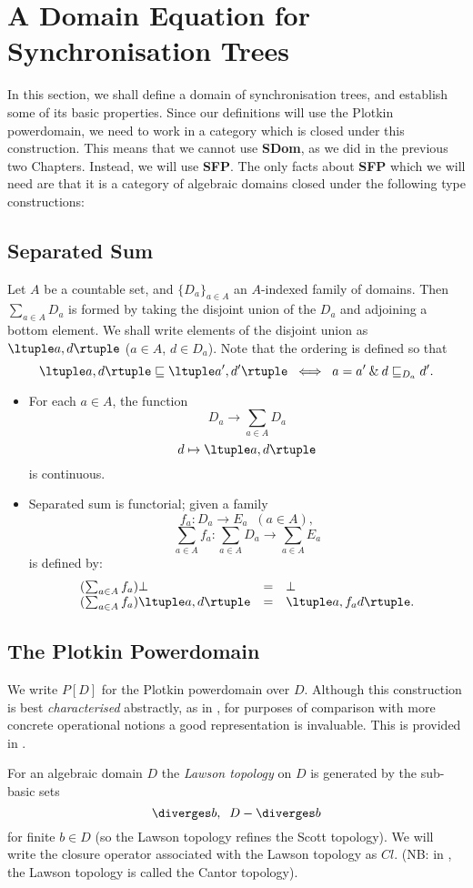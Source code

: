 \section{A Domain Equation for Synchronisation Trees}

In this section, we shall define a domain of synchronisation trees, and establish some of its basic properties.
Since our definitions will use the Plotkin powerdomain, we need to work in a category which is closed under this construction.
This means that we cannot use {\bf SDom}, as we did in the previous two Chapters.
Instead, we will use {\bf SFP}.
The only facts about {\bf SFP} which we will need are that it is a category of algebraic domains closed under the following type constructions:
\subsection*{Separated Sum}
Let $A$ be a countable set, and $\{ D_{a} \}_{a \in A}$ an $A$-indexed family of domains. Then $\sum_{a \in A} D_{a}$ is formed by taking the disjoint union of the $D_{a}$ and adjoining a bottom element.
We shall write elements of the disjoint union as $\ltuple a, d \rtuple$ ($a \in A$, $d \in D_{a}$).
Note that the ordering is defined so that
\[ \ltuple a, d \rtuple \sqsubseteq \ltuple a' , d' \rtuple \;\; \Longleftrightarrow \;\; a = a' \: \& \: d \sqsubseteq_{D_{a}} d' . \]
\begin{itemize}
\item For each $a \in A$, the function
\[ D_{a} \rightarrow \sum_{a \in A} D_{a} \]
\[ d \mapsto \ltuple a, d \rtuple \]
is continuous.

\item Separated sum is functorial; given a family
\[ f_{a} : D_{a} \rightarrow E_{a} \;\; (a \in A) , \]
\[ \sum_{a \in A} f_{a} : \sum_{a \in A} D_{a} \rightarrow \sum_{a \in A} E_{a} \]
is defined by:
\[ \begin{array}{lll}
(\sum_{a \in A} f_{a}) \bot & = & \bot \\
(\sum_{a \in A} f_{a}) \ltuple a, d \rtuple & = & \ltuple a, f_{a} d \rtuple .
\end{array} \]
\end{itemize}

\subsection*{The Plotkin Powerdomain}
We write $P[D]$ for the Plotkin powerdomain over $D$.
Although this construction is best {\em characterised} abstractly, as in 
\cite{HP79}, for purposes of comparison with more concrete operational notions a good representation is invaluable.
This is provided in \cite{Plo76,PloLN}.
\begin{definition}
{\rm For an algebraic domain $D$ the {\em Lawson topology} on $D$ is generated by the sub-basic sets
\[ \diverges b , \;\; D - \diverges b \]
for finite $b \in D$ (so the Lawson topology refines the Scott topology). 
We will write the closure operator associated with the Lawson topology as $Cl$. (NB: in \cite{Plo76}, the Lawson topology is called the Cantor topology).}
\end{definition}

